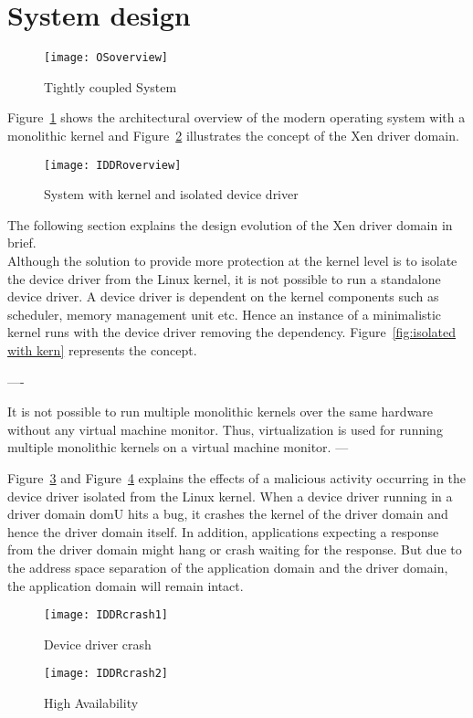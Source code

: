 \section{System design}\label{design}
\begin{figure}[!ht]
\centering
\texttt{[image: OSoverview]}
\caption{Tightly coupled System}
\label{fig:monolithic}
\end{figure}
Figure~\ref{fig:monolithic} shows the architectural overview of the modern operating system with a monolithic kernel and Figure~\ref{fig:isolated} illustrates the concept of the Xen driver domain.
\begin{figure}[!ht]
\centering
\texttt{[image: IDDRoverview]}
\caption{System with kernel and isolated device driver}
\label{fig:isolated}
\end{figure}

The following section explains the design evolution of the Xen driver domain in brief. 
\\
Although the solution to provide more protection at the kernel level is to isolate the device driver from the Linux kernel, it is not possible to run a standalone device driver. A device driver is dependent on the kernel components such as scheduler, memory management unit etc. Hence an instance of a minimalistic kernel runs with the device driver removing the dependency. Figure~\ref{fig:isolated with kern} represents the concept. 

----


It is not possible to run multiple monolithic kernels over the same hardware without any virtual machine monitor. Thus, virtualization is used for running multiple monolithic kernels on a virtual machine monitor.
---

Figure~\ref{fig:driver crash} and Figure~\ref{fig:high avail} explains the effects of a malicious activity occurring in the device driver isolated from the Linux kernel. When a device driver running in a driver domain domU hits a bug, it crashes the kernel of the driver domain and hence the driver domain itself. In addition, applications expecting a response from the driver domain might hang or crash waiting for the response. But due to the address space separation of the application domain and the driver domain, the application domain will remain intact.   
\begin{figure}[!ht]
\centering
\texttt{[image: IDDRcrash1]}
\caption{Device driver crash}
\label{fig:driver crash}
\end{figure}
\begin{figure}[!ht]
\centering
\texttt{[image: IDDRcrash2]}
\caption{High Availability}
\label{fig:high avail}
\end{figure}
\pagebreak
    
